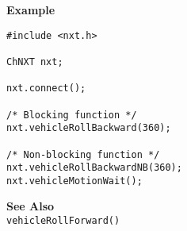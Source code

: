 \noindent
{\bf Example}
\begin{verbatim}
#include <nxt.h>

ChNXT nxt;

nxt.connect();

/* Blocking function */
nxt.vehicleRollBackward(360);

/* Non-blocking function */
nxt.vehicleRollBackwardNB(360);
nxt.vehicleMotionWait();
\end{verbatim}

\noindent
{\bf See Also}\\
\texttt{vehicleRollForward()}

